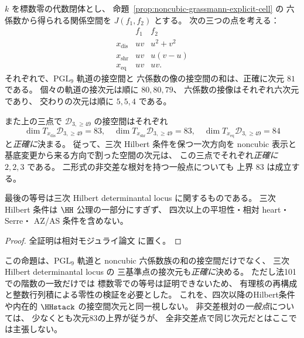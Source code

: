 \begin{proposition}
\label{prop:noncubic-third-degree-tangent}
$k$ を標数零の代数閉体とし、
命題~\ref{prop:noncubic-grassmann-explicit-cell} の
六係数から得られる関係空間を $J(f_1,f_2)$ とする。
次の三つの点を考える：
\[
\begin{array}{c|c|c}
 &f_1&f_2\\ \hline
 x_{\mathrm{dis}}&uv&u^2+v^2\\
 x_{\mathrm{shr}}&uv&u(v-u)\\
 x_{\mathrm{eq}}&uv&uv .
\end{array}
\tag{H3-types}\label{eq:noncubic-tangent-examples}
\]
それぞれで、$\mathrm{PGL}_9$ 軌道の接空間と
六係数の像の接空間の和は、正確に次元 $81$ である。
個々の軌道の接次元は順に $80,80,79$、
六係数の接像はそれぞれ六次元であり、
交わりの次元は順に $5,5,4$ である。

また上の三点で
$\mathcal D_{3,\ge49}$ の接空間はそれぞれ
\[
 \dim T_{x_{\mathrm{dis}}}\mathcal D_{3,\ge49}=83,
 \quad
 \dim T_{x_{\mathrm{shr}}}\mathcal D_{3,\ge49}=83,
 \quad
 \dim T_{x_{\mathrm{eq}}}\mathcal D_{3,\ge49}=84
 \tag{H3-bound}\label{eq:noncubic-tangent-bounds}
\]
と\emph{正確に}決まる。
従って、三次 Hilbert 条件を保つ一次方向を
noncubic 表示と基底変更から来る方向で割った空間の次元は、
この三点でそれぞれ\emph{正確に} $2,2,3$ である。
二形式の非交差な根対を持つ一般点についても
上界 $83$ は成立する。

最後の等号は三次 Hilbert determinantal locus に関するものである。
三次 Hilbert 条件は $\HH$ 公理の一部分にすぎず、
四次以上の平坦性・相対 heart・Serre・
AZ/AS 条件を含めない。
\end{proposition}
\begin{proof}
全証明は相対モジュライ論文 \cite[\texttt{noncubic_stack}]{QuadricModuli2026} に置く。
\end{proof}

\begin{remark}[接空間の正確な解釈]
この命題は、$\mathrm{PGL}_9$ 軌道と
noncubic 六係数族の和の接空間だけでなく、
三次 Hilbert determinantal locus の
三基準点の接次元も\emph{正確に}決める。
ただし法101での階数の一致だけでは
標数零での等号は証明できないため、
有理核の再構成と整数行列積による零性の検証を必要とした。
これを、四次以降のHilbert条件や内在的
$\HHstack$ の接空間次元と同一視しない。
非交差根対の\emph{一般点}については、
少なくとも次元83の上界が従うが、
全非交差点で同じ次元だとはここでは主張しない。
\end{remark}

